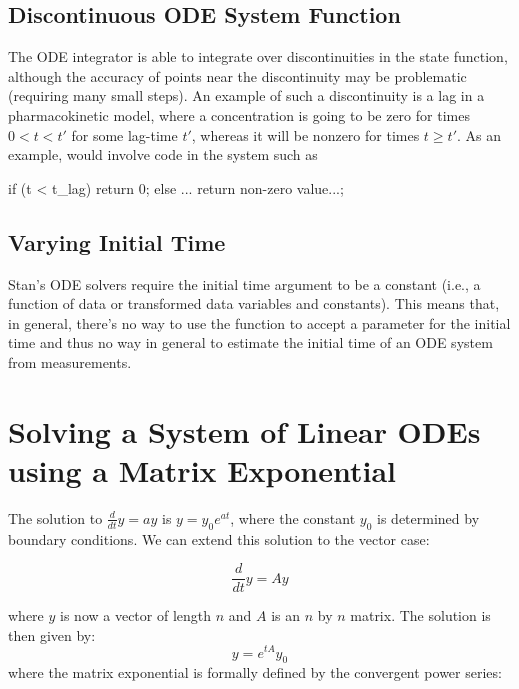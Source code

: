 \subsection{Discontinuous ODE System Function}

The ODE integrator is able to integrate over discontinuities in the
state function, although the accuracy of points near the discontinuity
may be problematic (requiring many small steps).  An example of such a
discontinuity is a lag in a pharmacokinetic model, where a
concentration is going to be zero for times $0 < t < t'$ for some
lag-time $t'$, whereas it will be nonzero for times $t \geq t'$.  As
an example, would involve code in the system such as
%
\begin{stancode}
if (t < t_lag)
  return 0;
else
  ... return non-zero value...;
\end{stancode}


\subsection{Varying Initial Time}

Stan's ODE solvers require the initial time argument to be a constant
(i.e., a function of data or transformed data variables and
constants).  This means that, in general, there's no way to use the
 function to accept a parameter for the initial
time and thus no way in general to estimate the initial time of an ODE
system from measurements.

\section{Solving a System of Linear ODEs using a Matrix Exponential}

The solution to $\frac{d}{dt} y = ay$ is $y = y_0e^{at}$, where the constant
$y_0$ is determined by boundary conditions. We can extend this solution
to the vector case:

\begin{equation}\label{ode.linODEs}
\frac{d}{dt}y = A y
\end{equation}

where $y$ is now a vector of length $n$ and $A$ is an $n$ by $n$ matrix. The
solution is then given by:
\begin{equation}\label{ode.linOEs.sln}
y = e^{tA}y_0
\end{equation}
where the matrix exponential is formally defined by the convergent power series:

